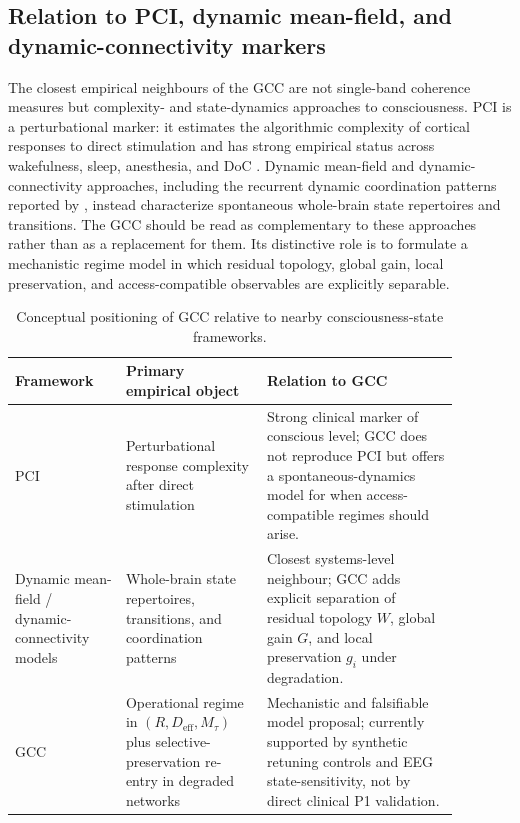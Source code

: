 ﻿\documentclass[11pt,a4paper]{article}
\theoremstyle{plain}
\theoremstyle{definition}
\theoremstyle{remark}
\begin{document}
\subsection{Relation to PCI, dynamic mean-field, and dynamic-connectivity markers}
\label{sec:relation-pci-dmf}

The closest empirical neighbours of the GCC are not single-band coherence measures but complexity- and state-dynamics approaches to consciousness. PCI is a perturbational marker: it estimates the algorithmic complexity of cortical responses to direct stimulation and has strong empirical status across wakefulness, sleep, anesthesia, and DoC \citep{casali2013,sarasso2015}. Dynamic mean-field and dynamic-connectivity approaches, including the recurrent dynamic coordination patterns reported by \citet{demertzi2019}, instead characterize spontaneous whole-brain state repertoires and transitions. The GCC should be read as complementary to these approaches rather than as a replacement for them. Its distinctive role is to formulate a mechanistic regime model in which residual topology, global gain, local preservation, and access-compatible observables are explicitly separable.

\begin{table}[h]
\centering
\caption{Conceptual positioning of GCC relative to nearby consciousness-state frameworks.}
\label{tab:framework-positioning}
\small
\begin{tabular}{p{0.22\linewidth}p{0.28\linewidth}p{0.38\linewidth}}
\hline
Framework & Primary empirical object & Relation to GCC \\
\hline
PCI & Perturbational response complexity after direct stimulation & Strong clinical marker of conscious level; GCC does not reproduce PCI but offers a spontaneous-dynamics model for when access-compatible regimes should arise. \\
Dynamic mean-field / dynamic-connectivity models & Whole-brain state repertoires, transitions, and coordination patterns & Closest systems-level neighbour; GCC adds explicit separation of residual topology $W$, global gain $G$, and local preservation $g_i$ under degradation. \\
GCC & Operational regime in $(R, D_{\mathrm{eff}}, M_\tau)$ plus selective-preservation re-entry in degraded networks & Mechanistic and falsifiable model proposal; currently supported by synthetic retuning controls and EEG state-sensitivity, not by direct clinical P1 validation. \\
\hline
\end{tabular}
\end{table}
\end{document}
